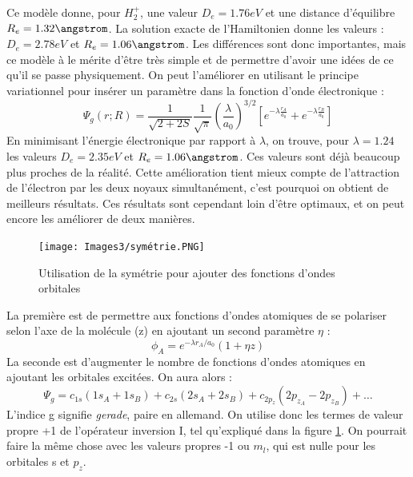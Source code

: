 Ce modèle donne, pour $H_2^+$, une valeur $D_e = 1.76eV$ et une distance d'équilibre $R_e = 1.32 \angstrom$. La solution exacte de l'Hamiltonien donne les valeurs : $D_e = 2.78eV$ et $R_e=1.06\angstrom$. Les différences sont donc importantes, mais ce modèle à le mérite d'être très simple et de permettre d'avoir une idées de ce qu'il se passe physiquement. \newline
On peut l'améliorer en utilisant le principe variationnel pour insérer un paramètre dans la fonction d'onde électronique : 
\begin{equation*}
    \Psi_g(r;R) = \frac{1}{\sqrt{2+2S}}\frac{1}{\sqrt{\pi}}\left(\frac{\lambda}{a_0}\right)^{3/2}\left[e^{-\lambda\frac{r_A}{a_0}} + e^{-\lambda\frac{r_B}{a_0}}\right]
\end{equation*}
En minimisant l'énergie électronique par rapport à $\lambda$, on trouve, pour $\lambda = 1.24$ les valeurs $D_e = 2.35eV$ et $R_e = 1.06\angstrom$. Ces valeurs sont déjà beaucoup plus proches de la réalité. Cette amélioration tient mieux compte de l'attraction de l'électron par les deux noyaux simultanément, c'est pourquoi on obtient de meilleurs résultats.\newline
Ces résultats sont cependant loin d'être optimaux, et on peut encore les améliorer de deux manières.\newline
\begin{figure}[ht]
    \centering
    \texttt{[image: Images3/symétrie.PNG]}
    \caption{Utilisation de la symétrie pour ajouter des fonctions d'ondes orbitales}
    \label{fig:sym}
\end{figure}
La première est de permettre aux fonctions d'ondes atomiques de se polariser selon l'axe de la molécule (z) en ajoutant un second paramètre $\eta$ : 
\begin{equation*}
    \phi_A = e^{-\lambda r_A/a_0}(1+\eta z)
\end{equation*}
La seconde est d'augmenter le nombre de fonctions d'ondes atomiques en ajoutant les orbitales excitées. On aura alors : 
\begin{equation*}
    \Psi_g = c_{1s}(1s_A+1s_B) + c_{2s}(2s_A+2s_B) + c_{2p_z}(2p_{z_A}-2p_{z_B}) + \dots
\end{equation*}
L'indice g signifie \textit{gerade}, paire en allemand. On utilise donc les termes de valeur propre +1 de l'opérateur inversion I, tel qu'expliqué dans la figure \ref{fig:sym}.
On pourrait faire la même chose avec les valeurs propres -1 ou $m_l$, qui est nulle pour les orbitales s et $p_z$.\newline


